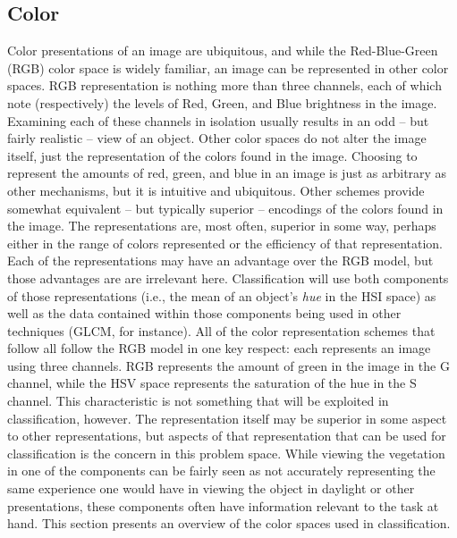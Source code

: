 \documentclass[letterpaper, notitlepage]{report}
\begin{document}
%
%
\subsection{Color}
Color presentations of an image are ubiquitous, and while the Red-Blue-Green (RGB) color space is widely familiar, an image can be represented in other color spaces. RGB representation is nothing more than three channels, each of which note (respectively) the levels of Red, Green, and Blue brightness in the image.  Examining each of these channels in isolation usually results in an odd -- but fairly realistic -- view of an object. Other color spaces do not alter the image itself, just the representation of the colors found in the image.  Choosing to represent the amounts of red, green, and blue in an image is just as arbitrary as other mechanisms, but it is intuitive and ubiquitous. Other schemes provide somewhat equivalent -- but typically superior -- encodings of the colors found in the image. The representations are, most often, superior in some way, perhaps either in the range of colors represented or the efficiency of that representation. Each of the representations may have an advantage over the RGB model, but those advantages are are irrelevant  here. Classification will use both components of those representations (i.e., the mean of an object's \textit{hue} in the HSI space) as well as the data contained within those components being used in other techniques (GLCM, for instance). All of the color representation schemes that follow all follow the RGB model in one key respect: each represents an image using three channels. RGB represents the amount of green in the image in the G channel, while the HSV space represents the saturation of the hue in the S channel. This characteristic is not something that will be exploited in classification, however. The representation itself may be superior in some aspect to other representations, but aspects of that representation that can be used for classification is the concern in this problem space. While viewing the vegetation in one of the components can be fairly seen as not accurately representing the same experience one would have in viewing the object in daylight or other presentations, these components often have information relevant to the task at hand. This section presents an overview of the color spaces used in classification.
\end{document}
